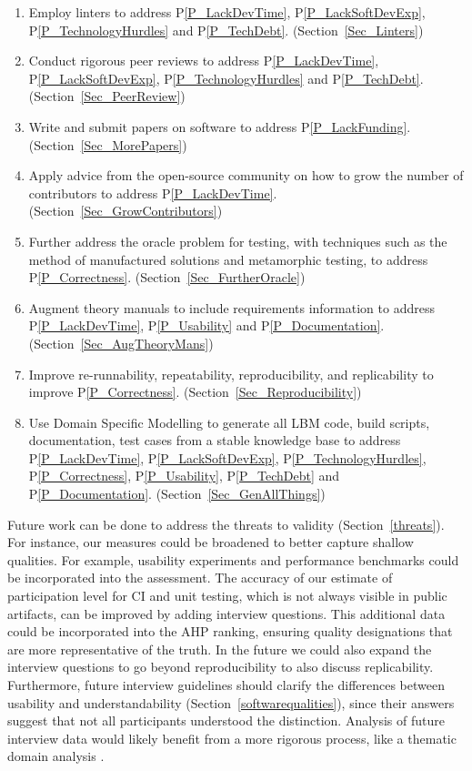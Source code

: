 \documentclass[final, 3p, times, authoryear]{elsarticle}
\newcommand{\ppref}[1]{P\ref{#1}}
\begin{document}
\begin{enumerate}
	\item Employ linters to address \ppref{P_LackDevTime}, \ppref{P_LackSoftDevExp}, \ppref{P_TechnologyHurdles} and \ppref{P_TechDebt}. (Section~\ref{Sec_Linters})
	\item Conduct rigorous peer reviews to address \ppref{P_LackDevTime},
	\ppref{P_LackSoftDevExp}, \ppref{P_TechnologyHurdles} and
	\ppref{P_TechDebt}.	(Section~\ref{Sec_PeerReview})
	\item Write and submit papers on software to address \ppref{P_LackFunding}.
	(Section~\ref{Sec_MorePapers})
	\item Apply advice from the open-source community on how to grow the number
	of contributors to address \ppref{P_LackDevTime}.
	(Section~\ref{Sec_GrowContributors})
	\item Further address the oracle problem for testing, with techniques such as the method of manufactured solutions and metamorphic testing, to address
	\ppref{P_Correctness}. (Section~\ref{Sec_FurtherOracle})
	\item Augment theory manuals to include requirements information to address
	\ppref{P_LackDevTime}, \ppref{P_Usability} and \ppref{P_Documentation}.
	(Section~\ref{Sec_AugTheoryMans})
	\item Improve re-runnability, repeatability, reproducibility, and
	replicability to improve \ppref{P_Correctness}.
	(Section~\ref{Sec_Reproducibility})
	\item Use Domain Specific Modelling to generate all LBM code, build scripts,
	documentation, test cases from a stable knowledge base to address
	\ppref{P_LackDevTime}, \ppref{P_LackSoftDevExp},
	\ppref{P_TechnologyHurdles}, \ppref{P_Correctness}, \ppref{P_Usability},
	\ppref{P_TechDebt} and \ppref{P_Documentation}.
	(Section~\ref{Sec_GenAllThings})
\end{enumerate}

Future work can be done to address the threats to validity
(Section~\ref{threats}).  For instance, our measures could be broadened to
better capture shallow qualities. For example, usability experiments and
performance benchmarks could be incorporated into the assessment. The accuracy
of our estimate of participation level for CI and unit testing, which is not
always visible in public artifacts, can be improved by adding interview
questions. This additional data could be incorporated into the AHP ranking,
ensuring quality designations that are more representative of the truth. In the
future we could also expand the interview questions to go beyond reproducibility
to also discuss replicability. Furthermore, future interview guidelines should
clarify the differences between usability and understandability
(Section~\ref{softwarequalities}), since their answers suggest that not all
participants understood the distinction.  Analysis of future interview data
would likely benefit from a more rigorous process, like a thematic domain
analysis \citep{JungEtAl2022}.
\end{document}
